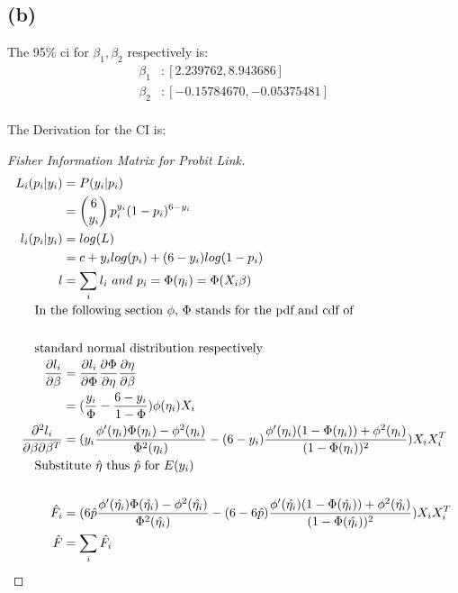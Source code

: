 \documentclass[15pt,a4paper]{article}\usepackage[]{graphicx}\usepackage[]{color}
\begin{document}
\subsection{(b)}
The 95\% ci for $\beta_1, \beta_2$ respectively is:
\begin{align*}
\beta_1&: [2.239762, 8.943686]\\
\beta_2&: [-0.15784670, -0.05375481]
\end{align*}\\

The Derivation for the CI is:
\begin{proof}[Fisher Information Matrix for Probit Link]
    \begin{align*}
    L_i(p_i|y_i) &= P(y_i|p_i)\\
                 &= \begin{pmatrix}
                 6 \\
                 y_i
                 \end{pmatrix} p_i^{y_i}(1-p_i)^{6-y_i}\\
    l_i(p_i|y_i) &= log(L)\\
                 &= c + y_ilog(p_i) + (6-y_i)log(1-p_i)\\
    l &= \sum_i{l_i}\ and\ p_i = \Phi(\eta_i) = \Phi(X_i\beta)\\
    \noalign{\text{In the following section $\phi$, $\Phi$ stands for the pdf and cdf of }}\\
    \noalign{\text{standard normal distribution respectively}}
    \frac{\partial l_i}{\partial \beta} &= \frac{\partial l_i}{\partial \Phi} \frac{\partial \Phi}{\partial \eta} \frac{\partial \eta}{\partial \beta}\\
                                        &= (\frac{y_i}{\Phi} - \frac{6-y_i}{1-\Phi}) \phi(\eta_i)X_i\\
    \frac{\partial^2 l_i}{\partial \beta \partial \beta^T} &= (y_i\frac{\phi'(\eta_i)\Phi(\eta_i)-\phi^2(\eta_i)}{\Phi^2(\eta_i)} - (6-y_i)\frac{\phi'(\eta_i)(1-\Phi(\eta_i))+\phi^2(\eta_i)}{(1-\Phi(\eta_i))^2})X_iX_i^T\\
    \noalign{\text{Substitute $\hat{\eta}$ thus $\hat{p}$ for $E(y_i)$}}\\
    \hat{F_i} &= (6\hat{p}\frac{\phi'(\hat{\eta_i})\Phi(\hat{\eta_i})-\phi^2(\hat{\eta_i})}{\Phi^2(\hat{\eta_i})} - (6-6\hat{p})\frac{\phi'(\hat{\eta_i})(1-\Phi(\hat{\eta_i}))+\phi^2(\hat{\eta_i})}{(1-\Phi(\hat{\eta_i}))^2})X_iX_i^T\\
    \hat{F} &= \sum_i\hat{F_i}\\
    \end{align*}
\end{proof}
\end{document}
